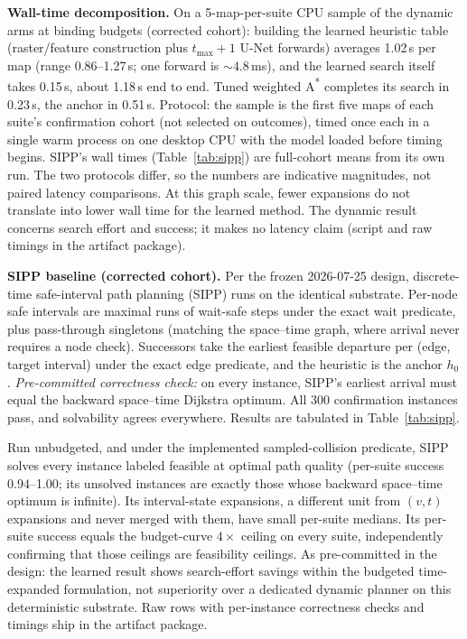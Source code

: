\documentclass[letterpaper]{article} %
\begin{document}
\textbf{Wall-time decomposition.} On a 5-map-per-suite CPU sample of the dynamic arms at binding budgets (corrected cohort): building the learned heuristic table (raster/feature construction plus $t_{\max}{+}1$ U-Net forwards) averages 1.02\,s per map (range 0.86--1.27\,s; one forward is ${\sim}4.8$\,ms), and the learned search itself takes 0.15\,s, about 1.18\,s end to end. Tuned weighted A\textsuperscript{*} completes its search in 0.23\,s, the anchor in 0.51\,s. Protocol: the sample is the first five maps of each suite's confirmation cohort (not selected on outcomes), timed once each in a single warm process on one desktop CPU with the model loaded before timing begins. SIPP's wall times (Table~\ref{tab:sipp}) are full-cohort means from its own run. The two protocols differ, so the numbers are indicative magnitudes, not paired latency comparisons. At this graph scale, fewer expansions do not translate into lower wall time for the learned method. The dynamic result concerns search effort and success; it makes no latency claim (script and raw timings in the artifact package).

\textbf{SIPP baseline (corrected cohort).} Per the frozen 2026-07-25 design, discrete-time safe-interval path planning (SIPP) runs on the identical substrate. Per-node safe intervals are maximal runs of wait-safe steps under the exact wait predicate, plus pass-through singletons (matching the space--time graph, where arrival never requires a node check). Successors take the earliest feasible departure per (edge, target interval) under the exact edge predicate, and the heuristic is the anchor $h_0$. \emph{Pre-committed correctness check:} on every instance, SIPP's earliest arrival must equal the backward space--time Dijkstra optimum. All 300 confirmation instances pass, and solvability agrees everywhere. Results are tabulated in Table~\ref{tab:sipp}.

Run unbudgeted, and under the implemented sampled-collision predicate, SIPP solves every instance labeled feasible at optimal path quality (per-suite success 0.94--1.00; its unsolved instances are exactly those whose backward space--time optimum is infinite). Its interval-state expansions, a different unit from $(v,t)$ expansions and never merged with them, have small per-suite medians. Its per-suite success equals the budget-curve $4\times$ ceiling on every suite, independently confirming that those ceilings are feasibility ceilings. As pre-committed in the design: the learned result shows search-effort savings within the budgeted time-expanded formulation, not superiority over a dedicated dynamic planner on this deterministic substrate. Raw rows with per-instance correctness checks and timings ship in the artifact package.
\end{document}
